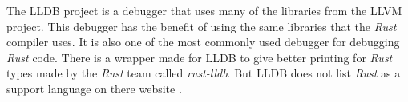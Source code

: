 

The \gls{LLDB} project is a debugger that uses many of the libraries from the \gls{LLVM} project.
This debugger has the benefit of using the same libraries that the \emph{Rust} compiler uses.
It is also one of the most commonly used debugger for debugging \emph{Rust} code.
There is a wrapper made for \gls{LLDB} to give better printing for \emph{Rust} types made by the \emph{Rust} team called \emph{rust-lldb}.
But \gls{LLDB} does not list \emph{Rust} as a support language on there website \cite{lldb}.


